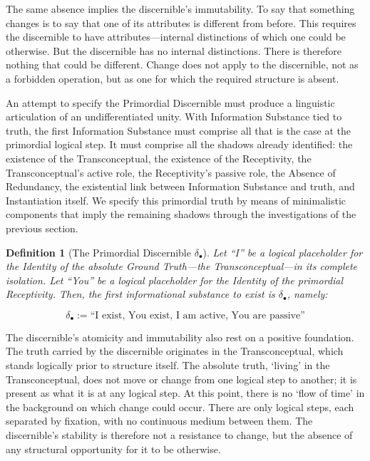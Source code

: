 \documentclass[11pt, a4paper]{article}
\theoremstyle{formalism}
\newtheorem{formalism}{Definition}
\begin{document}
The same absence implies the discernible's immutability. To say that something
changes is to say that one of its attributes is different from before. This
requires the discernible to have attributes---internal distinctions of which
one could be otherwise. But the discernible has no internal distinctions.
There is therefore nothing that could be different. Change does not apply to
the discernible, not as a forbidden operation, but as one for which the
required structure is absent.

An attempt to specify the Primordial Discernible must produce a linguistic
articulation of an undifferentiated unity. With Information Substance tied to
truth, the first Information Substance must comprise all that is the case at
the primordial logical step. It must comprise all the shadows already
identified: the existence of the Transconceptual, the existence of the
Receptivity, the Transconceptual's active role, the Receptivity's passive
role, the Absence of Redundancy, the existential link between Information
Substance and truth, and Instantiation itself. We specify this primordial
truth by means of minimalistic components that imply the remaining shadows
through the investigations of the previous section.

\begin{formalism}[The Primordial Discernible $\delta_\bullet$]
    Let ``I'' be a logical placeholder for the Identity of the absolute Ground
    Truth---the Transconceptual---in its complete isolation. Let ``You'' be a
    logical placeholder for the Identity of the primordial Receptivity. Then,
    the first informational substance to exist is $\delta_\bullet$, namely:

    \begin{equation}
         \delta_\bullet := \text{``I exist, You exist, I am active, You are passive''}
    \end{equation}
\end{formalism}

The discernible's atomicity and immutability also rest on a positive
foundation. The truth carried by the discernible originates in the
Transconceptual, which stands logically prior to structure itself. The
absolute truth, `living' in the Transconceptual, does not move or change from
one logical step to another; it is present as what it is at any logical step.
At this point, there is no `flow of time' in the background on which change
could occur. There are only logical steps, each separated by fixation, with
no continuous medium between them. The discernible's stability is therefore
not a resistance to change, but the absence of any structural opportunity for
it to be otherwise.
\end{document}

